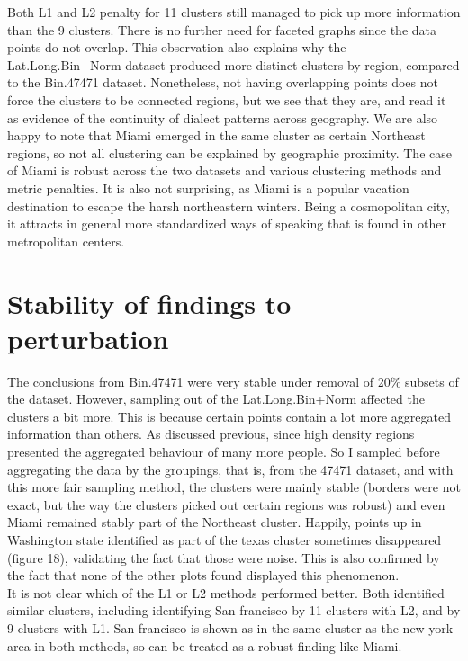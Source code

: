 \documentclass{article}\usepackage[]{graphicx}\usepackage[]{color}
\begin{document}
Both L1 and L2 penalty for 11 clusters still managed to pick up more information than the 9 clusters.  There is no further need for faceted graphs since the data points do not overlap.  This observation also explains why the Lat.Long.Bin+Norm dataset produced more distinct clusters by region, compared to the Bin.47471 dataset. Nonetheless, not having overlapping points does not force the clusters to be connected regions, but we see that they are, and read it as evidence of the continuity of dialect patterns across geography.  We are also happy to note that Miami emerged in the same cluster as certain Northeast regions, so not all clustering can be explained by geographic proximity.  The case of Miami is robust across the two datasets and various clustering methods and metric penalties.  It is also not surprising, as Miami is a popular vacation destination to escape the harsh northeastern winters.  Being a cosmopolitan city, it attracts in general more standardized ways of speaking that is found in other metropolitan centers.  \\




\section{Stability of findings to perturbation}

The conclusions from Bin.47471 were very stable under removal of 20\% subsets of the dataset.  However, sampling out of the Lat.Long.Bin+Norm affected the clusters a bit more.  This is because certain points contain a lot more aggregated information than others.  As discussed previous, since high density regions presented the aggregated behaviour of many more people.  So I sampled before aggregating the data by the groupings, that is, from the 47471 dataset, and with this more fair sampling method, the clusters were mainly stable (borders were not exact, but the way the clusters picked out certain regions was robust) and even Miami remained stably part of the Northeast cluster.  Happily, points up in Washington state identified as part of the texas cluster sometimes disappeared (figure 18), validating the fact that those were noise.  This is also confirmed by the fact that none of the other plots found displayed this phenomenon.\\

It is not clear which of the L1 or L2 methods performed better.  Both identified similar clusters, including identifying San francisco by 11 clusters with L2, and by 9 clusters with L1.  San francisco is shown as in the same cluster as the new york area in both methods, so can be treated as a robust finding like Miami.  \\
\end{document}

